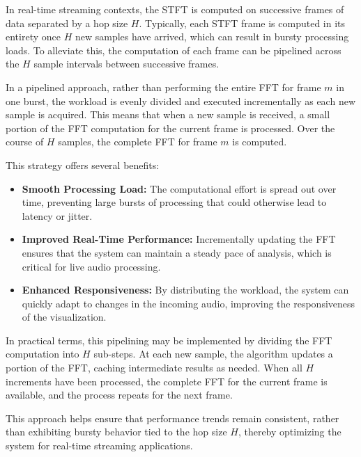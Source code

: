 \documentclass[12pt,letter]{article}
\begin{document}
In real-time streaming contexts, the STFT is computed on successive frames of
data separated by a hop size \( H \). Typically, each STFT frame is computed
in its entirety once \( H \) new samples have arrived, which can result in
bursty processing loads. To alleviate this, the computation of each frame can
be pipelined across the \( H \) sample intervals between successive frames.

In a pipelined approach, rather than performing the entire FFT for frame
\( m \) in one burst, the workload is evenly divided and executed
incrementally as each new sample is acquired. This means that when a new
sample is received, a small portion of the FFT computation for the current
frame is processed. Over the course of \( H \) samples, the complete FFT for
frame \( m \) is computed.

This strategy offers several benefits:
\begin{itemize}
  \item \textbf{Smooth Processing Load:} The computational effort is spread
  out over time, preventing large bursts of processing that could otherwise
  lead to latency or jitter.
  \item \textbf{Improved Real-Time Performance:} Incrementally updating the
  FFT ensures that the system can maintain a steady pace of analysis, which
  is critical for live audio processing.
  \item \textbf{Enhanced Responsiveness:} By distributing the workload, the
  system can quickly adapt to changes in the incoming audio, improving the
  responsiveness of the visualization.
\end{itemize}

In practical terms, this pipelining may be implemented by dividing the FFT
computation into \( H \) sub-steps. At each new sample, the algorithm updates
a portion of the FFT, caching intermediate results as needed. When all
\( H \) increments have been processed, the complete FFT for the current
frame is available, and the process repeats for the next frame.

This approach helps ensure that performance trends remain consistent, rather
than exhibiting bursty behavior tied to the hop size \( H \), thereby
optimizing the system for real-time streaming applications.


\clearpage
\finalPage
\end{document}
